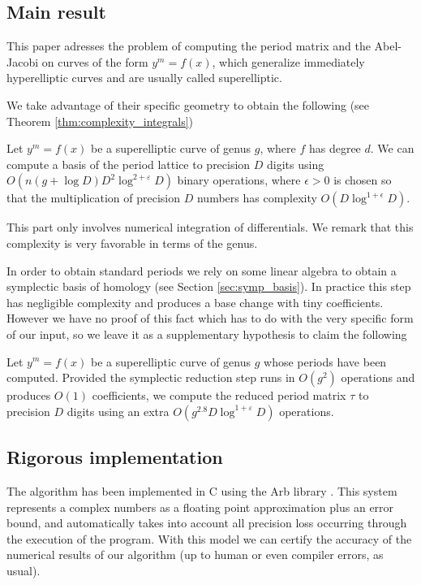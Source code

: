 \documentclass[main.tex]{subfiles}
\begin{document}
  \subsection{Main result}

  This paper adresses the problem of computing the period matrix and the
  Abel-Jacobi on curves of the form $y^m = f(x)$, which generalize immediately
  hyperelliptic curves and are usually called superelliptic.

  We take advantage of their specific geometry to obtain the following
  (see Theorem \ref{thm:complexity_integrals})
  \begin{thm}
      Let $y^m=f(x)$ be a superelliptic curve of genus $g$,
      where $f$ has degree $d$.
      We can compute a basis of the period lattice to precision
      $D$ digits using $O(n(g+\log D)D^2\log^{2+\varepsilon} D)$
      binary operations, where $\epsilon>0$ is chosen so that
      the multiplication of precision $D$ numbers has complexity
      $O(D\log^{1+\epsilon}D)$.
  \end{thm}

  This part only involves numerical integration of differentials. We remark
  that this complexity is very favorable in terms of the genus.

  In order
  to obtain standard periods we rely on some linear algebra to obtain a
  symplectic basis of homology (see Section \ref{sec:symp_basis}).
  In practice this step has negligible complexity
  and produces a base change with tiny coefficients. However we have no proof
  of this fact which has to do with the very specific form of our input,
  so we leave it as a supplementary hypothesis to claim the
  following
  \begin{thm}
      Let $y^m=f(x)$ be a superelliptic curve of genus $g$ whose periods
      have been computed.
      Provided the symplectic reduction
      step runs in $O(g^2)$ operations and produces $O(1)$ coefficients,
      we compute the reduced period matrix $τ$ to precision $D$
      digits using an extra $O(g^{2.8}D\log^{1+\varepsilon}D)$ operations.
  \end{thm}

  \subsection{Rigorous implementation}

  The algorithm has been implemented in C using the Arb library \cite{Johansson2013arb}.
  This system represents a complex numbers as a floating point approximation
  plus an error bound, and automatically
  takes into account all precision loss occurring through the
  execution of the program. With this model we can certify
  the accuracy of the numerical results of our algorithm (up to human or even
  compiler errors, as usual).
\end{document}
